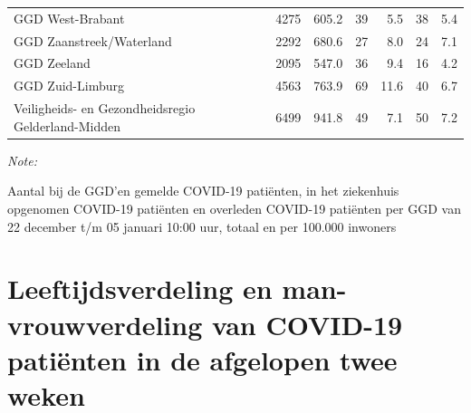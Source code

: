 \documentclass[
  english,
  man,floatsintext]{apa6}
\begin{document}
\begin{table}[H]
\begin{threeparttable}
\begin{tabular}{lrrrrrr}
GGD West-Brabant & 4275 & 605.2 & 39 & 5.5 & 38 & 5.4\\
GGD Zaanstreek/Waterland & 2292 & 680.6 & 27 & 8.0 & 24 & 7.1\\
GGD Zeeland & 2095 & 547.0 & 36 & 9.4 & 16 & 4.2\\
GGD Zuid-Limburg & 4563 & 763.9 & 69 & 11.6 & 40 & 6.7\\
Veiligheids- en Gezondheidsregio Gelderland-Midden & 6499 & 941.8 & 49 & 7.1 & 50 & 7.2\\
\bottomrule
\end{tabular}
\begin{tablenotes}
\item \textit{Note: } 
\item Aantal bij de GGD’en gemelde COVID-19 patiënten, in het ziekenhuis opgenomen COVID-19 patiënten en overleden COVID-19 patiënten per GGD van 22 december t/m 05 januari 10:00 uur, totaal en per 100.000 inwoners
\end{tablenotes}
\end{threeparttable}
\endgroup{}
\end{table}

\newpage

\hypertarget{leeftijdsverdeling-en-man-vrouwverdeling-van-covid-19-patiuxebnten-in-de-afgelopen-twee-weken}{%
\section{Leeftijdsverdeling en man-vrouwverdeling van COVID-19 patiënten in de afgelopen twee weken}\label{leeftijdsverdeling-en-man-vrouwverdeling-van-covid-19-patiuxebnten-in-de-afgelopen-twee-weken}}
\end{document}
